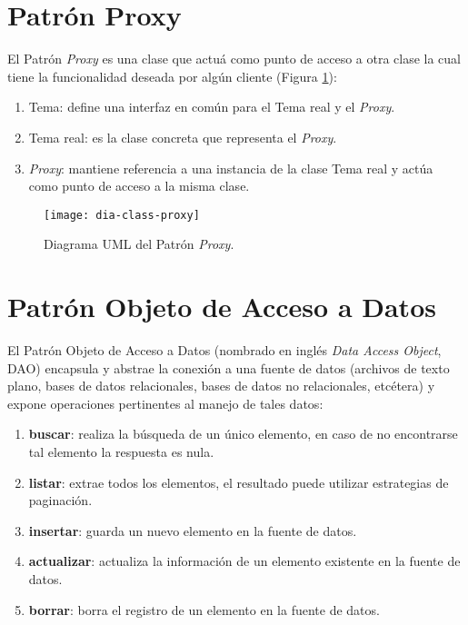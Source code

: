 \section{Patrón Proxy}\label{sec:proxy}
El Patrón \textit{Proxy} es una clase que actuá como punto de acceso a otra clase la cual tiene la funcionalidad deseada por algún cliente\cite{DesignPatternsLasater} (Figura \ref{fig:dia-class-proxy}):
\begin{enumerate}
  \item Tema: define una interfaz en común para el Tema real y el \textit{Proxy}.
  \item Tema real: es la clase concreta que representa el \textit{Proxy}.
  \item \textit{Proxy}: mantiene referencia a una instancia de la clase Tema real y actúa como punto de acceso a la misma clase.
\end{enumerate}
\begin{figure}[h]
  \centering
  \texttt{[image: dia-class-proxy]}
  \caption{Diagrama UML del Patrón \textit{Proxy}\cite{DesignPatternsLasater}.}
  \label{fig:dia-class-proxy}
\end{figure}

\section{Patrón Objeto de Acceso a Datos}\label{sec:dao}
El Patrón Objeto de Acceso a Datos (nombrado en inglés \textit{Data Access Object}, DAO) encapsula y abstrae la conexión a una fuente de datos (archivos de texto plano, bases de datos relacionales, bases de datos no relacionales, etcétera) y expone operaciones pertinentes al manejo de tales datos\cite{OCPJavaSE7,OCAPJavaSE7}:
\begin{enumerate}
	\item [] \textbf{buscar}: realiza la búsqueda de un único elemento, en caso de no encontrarse tal elemento la respuesta es nula.
	\item [] \textbf{listar}: extrae todos los elementos, el resultado puede utilizar estrategias de paginación.
	\item [] \textbf{insertar}: guarda un nuevo elemento en la fuente de datos.
	\item [] \textbf{actualizar}: actualiza la información de un elemento existente en la fuente de datos.
	\item [] \textbf{borrar}: borra el registro de un elemento en la fuente de datos.
\end{enumerate}



